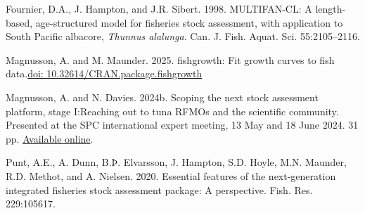 \documentclass{SCreport}
\newcommand\blob
{https://github.com/PacificCommunity/ofp-sam-transition-plan/blob/main}
\newcommand\present{\blob/presentations}
\begin{document}
\sloppy\setlength{}

\begin{description}\setlength\itemsep{0ex}
  \item Fournier, D.A., J. Hampton, and J.R. Sibert. 1998. MULTIFAN-CL: A
  length-based, age-structured model for fisheries stock assessment, with
  application to South Pacific albacore, \textit{Thunnus alalunga}. Can. J.
  Fish. Aquat. Sci. 55:2105--2116.
  \item Magnusson, A. and M. Maunder. 2025. fishgrowth: Fit growth curves to
  fish data.\linebreak \href{https://doi.org/10.32614/CRAN.package.fishgrowth}
  {doi: 10.32614/CRAN.package.fishgrowth}
  \item Magnusson, A. and N. Davies. 2024b. Scoping the next stock assessment
  platform, stage I:\linebreak Reaching out to tuna RFMOs and the scientific
  community. Presented at the SPC international expert meeting, 13 May and 18
  June 2024. 31 pp.
  \href{\present/2024_05_13_experts_scoping/2024_05_13_experts_scoping.pdf}
  {Available online}.
  \item Punt, A.E., A. Dunn, B.Þ. Elvarsson, J. Hampton, S.D. Hoyle, M.N.
  Maunder, R.D. Methot, and A. Nielsen. 2020. Essential features of the
  next-generation integrated fisheries stock assessment package: A perspective.
  Fish. Res. 229:105617.
\end{description}
\end{document}
